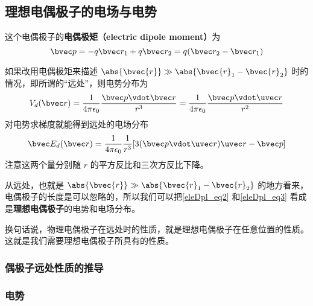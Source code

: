 \subsection{理想电偶极子的电场与电势}
这个电偶极子的\textbf{电偶极矩（electric dipole moment）}为
\begin{equation}\label{eleDpl_eq1}
\bvec p = -q \bvec r_1 + q \bvec r_2 = q (\bvec r_2 - \bvec r_1)
\end{equation} 

如果改用电偶极矩来描述 $\abs{\bvec{r}}\gg\\\abs{\bvec{r}_1-\bvec{r}_2}$ 时的情况，即所谓的“远处”，则电势分布为
\begin{equation}\label{eleDpl_eq2}
V_d(\bvec r) = \frac{1}{4\pi\epsilon_0} \frac{\bvec p\vdot \bvec r}{r^3} = \frac{1}{4\pi\epsilon_0} \frac{\bvec p \vdot \uvec r}{r^2}
\end{equation}
对电势求梯度就能得到远处的电场分布
\begin{equation}\label{eleDpl_eq3}
\bvec E_d(\bvec r) = \frac{1}{4\pi\epsilon_0} \frac{1}{r^3} [3(\bvec p \vdot \uvec r) \uvec r - \bvec p]
\end{equation}
注意这两个量分别随 $r$ 的平方反比和三次方反比下降。

从远处，也就是 $\abs{\bvec{r}}\gg\\\abs{\bvec{r}_1-\bvec{r}_2}$ 的地方看来，电偶极子的长度是可以忽略的，所以我们可以把\autoref{eleDpl_eq2} 和\autoref{eleDpl_eq3} 看成是\textbf{理想电偶极子}的电势和电场分布。

换句话说，物理电偶极子在远处时的性质，就是理想电偶极子在任意位置的性质。这就是我们需要理想电偶极子所具有的性质。



\subsubsection{偶极子远处性质的推导}

\subsubsection{电势}

